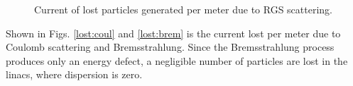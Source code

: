 \documentclass[a4paper,10pt]{article}
\begin{document}
\begin{figure}
\caption{Current of lost particles generated per meter due to RGS scattering.}
\label{gen} %
\end{figure}

Shown in Figs. \ref{lost:coul} and \ref{lost:brem} is the current lost per meter due to Coulomb scattering and Bremsstrahlung.  Since the Bremsstrahlung process produces only an energy defect, a negligible number of particles are lost in the linacs, where dispersion is zero.
\end{document}
